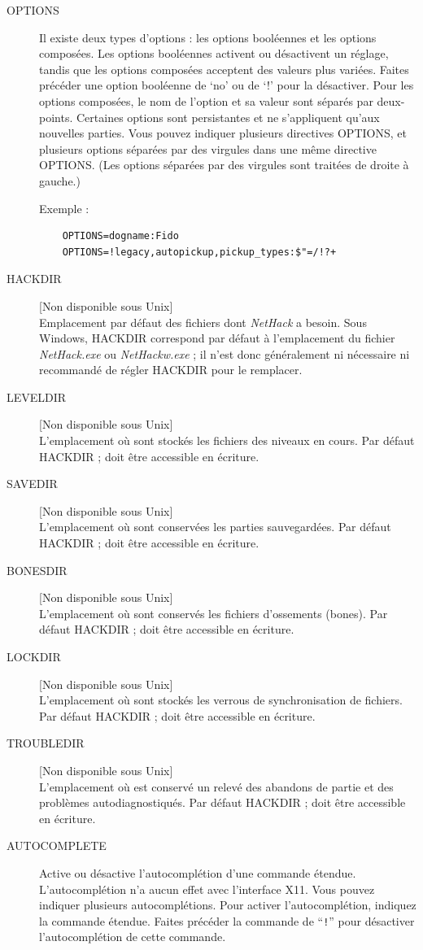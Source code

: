\documentclass[titlepage]{article}
\begin{document}
\begin{description}
\item[OPTIONS]
Il existe deux types d'options : les options booléennes et les options composées.
Les options booléennes activent ou désactivent un réglage, tandis que les options
composées acceptent des valeurs plus variées.
Faites précéder une option booléenne de `no' ou de `!' pour la désactiver.
Pour les options composées, le nom de l'option et sa valeur sont séparés par deux-points.
Certaines options sont persistantes et ne s'appliquent qu'aux nouvelles parties.
Vous pouvez indiquer plusieurs directives OPTIONS, et plusieurs options
séparées par des virgules dans une même directive OPTIONS.
(Les options séparées par des virgules sont traitées de droite à gauche.)

Exemple :
\begin{verbatim}
    OPTIONS=dogname:Fido
    OPTIONS=!legacy,autopickup,pickup_types:$"=/!?+
\end{verbatim}

\item[HACKDIR]
{[}Non disponible sous Unix]\\
Emplacement par défaut des fichiers dont \textit{NetHack} a besoin. Sous Windows, HACKDIR
correspond par défaut à l'emplacement du fichier \textit{NetHack.exe} ou \textit{NetHackw.exe} ;
il n'est donc généralement ni nécessaire ni recommandé de régler HACKDIR pour le remplacer.
\item[LEVELDIR]
{[}Non disponible sous Unix]\\
L'emplacement où sont stockés les fichiers des niveaux en cours. Par défaut HACKDIR ;
doit être accessible en écriture.
\item[SAVEDIR]
{[}Non disponible sous Unix]\\
L'emplacement où sont conservées les parties sauvegardées. Par défaut HACKDIR ; doit être
accessible en écriture.
\item[BONESDIR]
{[}Non disponible sous Unix]\\
L'emplacement où sont conservés les fichiers d'ossements (bones). Par défaut HACKDIR ; doit être
accessible en écriture.
\item[LOCKDIR]
{[}Non disponible sous Unix]\\
L'emplacement où sont stockés les verrous de synchronisation de fichiers. Par défaut
HACKDIR ; doit être accessible en écriture.
\item[TROUBLEDIR]
{[}Non disponible sous Unix]\\
L'emplacement où est conservé un relevé des abandons de partie et des problèmes
autodiagnostiqués. Par défaut HACKDIR ; doit être accessible en écriture.
%
%
\item[AUTOCOMPLETE]
Active ou désactive l'autocomplétion d'une commande étendue.
L'autocomplétion n'a aucun effet avec l'interface X11.
Vous pouvez indiquer plusieurs autocomplétions. Pour activer
l'autocomplétion, indiquez la commande étendue. Faites précéder la
commande de ``\texttt{!}'' pour désactiver l'autocomplétion
de cette commande.


\end{description}
\end{document}
